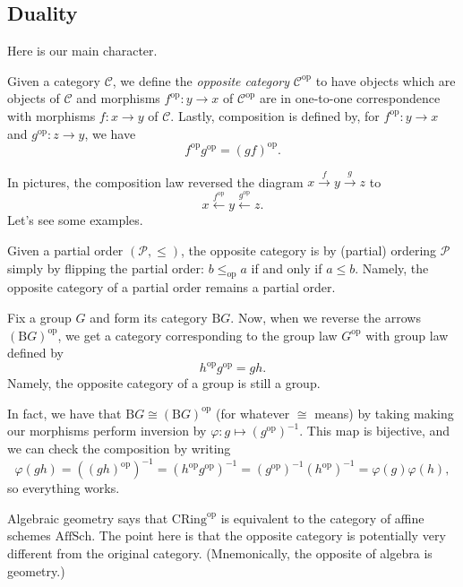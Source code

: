 \documentclass[../notes.tex]{subfiles}
\begin{document}
\subsection{Duality}
Here is our main character.
\begin{definition}
	Given a category $\mathcal C$, we define the \textit{opposite category} $\mathcal C^{\mathrm{op}}$ to have objects which are objects of $\mathcal C$ and morphisms $f^{\mathrm{op}}:y\to x$ of $\mathcal C^{\mathrm{op}}$ are in one-to-one correspondence with morphisms $f:x\to y$ of $\mathcal C$. Lastly, composition is defined by, for $f^\mathrm{op}:y\to x$ and $g^{\mathrm{op}}:z\to y$, we have
	\[f^\mathrm{op}g^\mathrm{op}=(gf)^\mathrm{op}.\]
\end{definition}
In pictures, the composition law reversed the diagram $x\stackrel f\to y\stackrel g\to z$ to
\[x\stackrel{f^\mathrm{op}}\leftarrow y\stackrel{g^\mathrm{op}}\leftarrow z.\]
Let's see some examples.
\begin{example}
	Given a partial order $(\mathcal P,\le)$, the opposite category is by (partial) ordering $\mathcal P$ simply by flipping the partial order: $b\le_\mathrm{op}a$ if and only if $a\le b$. Namely, the opposite category of a partial order remains a partial order.
\end{example}
\begin{example}
	Fix a group $G$ and form its category $\mathrm BG$. Now, when we reverse the arrows $(\mathrm BG)^{\mathrm{op}}$, we get a category corresponding to the group law $G^\mathrm{op}$ with group law defined by
	\[h^\mathrm{op}g^\mathrm{op}=gh.\]
	Namely, the opposite category of a group is still a group.
\end{example}
In fact, we have that $\mathrm BG\cong(\mathrm BG)^\mathrm{op}$ (for whatever $\cong$ means) by taking making our morphisms perform inversion by $\varphi:g\mapsto (g^\mathrm{op})^{-1}$. This map is bijective, and we can check the composition by writing
\[\varphi(gh)=\left((gh)^\mathrm{op}\right)^{-1}=\left(h^\mathrm{op}g^\mathrm{op}\right)^{-1}=\left(g^\mathrm{op}\right)^{-1}\left(h^\mathrm{op}\right)^{-1}=\varphi(g)\varphi(h),\]
so everything works.
\begin{example}
	Algebraic geometry says that $\mathrm{CRing}^\mathrm{op}$ is equivalent to the category of affine schemes $\mathrm{AffSch}$. The point here is that the opposite category is potentially very different from the original category. (Mnemonically, the opposite of algebra is geometry.)
\end{example}
\end{document}
